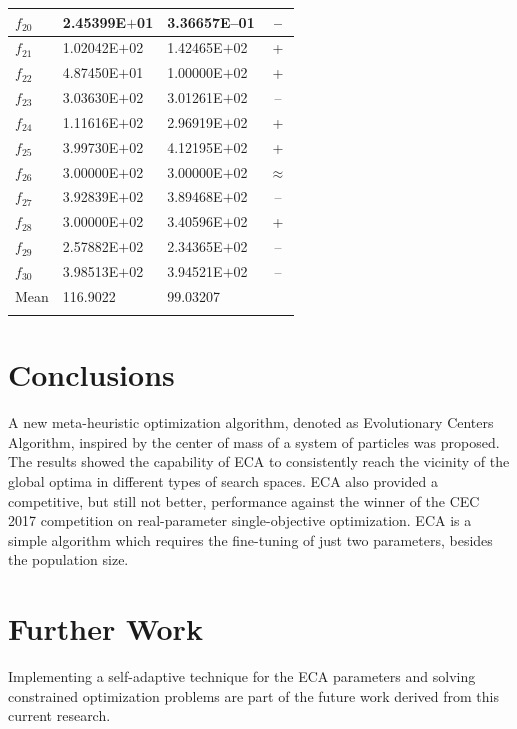 \documentclass[graybox]{svmult}
\begin{document}
\begin{table}[!ht]
{\begin{tabular}{p{1cm}p{2.5cm}p{2.5cm}c}
		$f_{20}$ & 2.45399E$+$01  & 3.36657E--01 & --  \\ \hline
		$f_{21}$ & 1.02042E$+$02  & 1.42465E$+$02 & +  \\ \hline
		$f_{22}$ & 4.87450E$+$01  & 1.00000E$+$02 & +  \\ \hline
		$f_{23}$ & 3.03630E$+$02  & 3.01261E$+$02 & --  \\ \hline
		$f_{24}$ & 1.11616E$+$02  & 2.96919E$+$02 & +  \\ \hline
		$f_{25}$ & 3.99730E$+$02  & 4.12195E$+$02 & +  \\ \hline
		$f_{26}$ & 3.00000E$+$02  & 3.00000E$+$02 & $\approx$  \\ \hline
		$f_{27}$ & 3.92839E$+$02  & 3.89468E$+$02 & --  \\ \hline
		$f_{28}$ & 3.00000E$+$02  & 3.40596E$+$02 & +  \\ \hline
		$f_{29}$ & 2.57882E$+$02  & 2.34365E$+$02 & --  \\ \hline
		$f_{30}$ & 3.98513E$+$02  & 3.94521E$+$02 & --  \\ \svhline
			Mean & 116.9022       & 99.03207 & \\ \svhline
	\end{tabular}
}
\end{table}



\section{Conclusions} %
\label{sec:conclusions}

A new meta-heuristic optimization algorithm, denoted as Evolutionary Centers 
Algorithm, inspired by the center of mass of a system of particles was proposed. 
The results showed the capability of ECA to consistently reach the vicinity 
of the global optima in different types of search spaces. ECA also provided 
a competitive, but still not better, performance against the winner of the 
CEC 2017 competition on real-parameter single-objective optimization. ECA 
is a simple algorithm which requires the fine-tuning of just two parameters, 
besides the population size.\\



\section{Further Work} %
\label{sec:further_work}

Implementing a self-adaptive technique for the ECA parameters and solving 
constrained optimization problems are part of the future work derived 
from this current research. 


\clearpage


\end{document}
